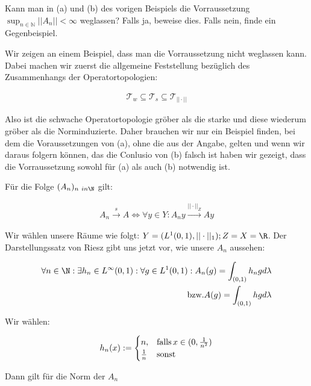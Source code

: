 \begin{exercise}
Kann man in (a) und (b) des vorigen Beispiels die Vorraussetzung
$\sup_{n \in \mathbb{N}} ||A_n|| < \infty$ weglassen?
Falls ja, beweise dies. Falls nein, finde ein Gegenbeispiel.
\end{exercise}
\begin{solution}

Wir zeigen an einem Beispiel, dass man die Vorraussetzung nicht weglassen kann.
Dabei machen wir zuerst die allgemeine Feststellung bezüglich des Zusammenhangs der
Operatortopologien:

\begin{align*}
  \mathcal{T}_w \subseteq \mathcal{T}_s \subseteq \mathcal{T}_{||\cdot||}
\end{align*}

Also ist die schwache Operatortopologie gröber als die starke und diese wiederum
gröber als die Norminduzierte. Daher brauchen wir nur ein Beispiel finden, bei dem
die Voraussetzungen von (a), ohne die aus der Angabe, gelten und wenn wir daraus folgern können, das die Conlusio von (b) falsch ist haben wir gezeigt, dass die Vorraussetzung sowohl
für (a) als auch (b) notwendig ist.

Für die Folge $(A_n)_{n \ in \N}$ gilt:

\begin{align*}
  A_n \stackrel{s}{\rightarrow} A
  \Leftrightarrow
  \forall y \in Y: A_n y \stackrel{||\cdot||_Z}{\rightarrow} Ay
\end{align*}

Wir wählen unsere Räume wie folgt: $Y = (L^1 (0,1), ||\cdot||_1) ; Z=X=\R$. Der
Darstellungssatz von Riesz gibt uns jetzt vor, wie unsere $A_n$ aussehen:

\begin{align*}
  \forall n \in \N: \exists h_n \in L^{\infty}(0,1):
  \forall g \in L^1 (0,1): A_n(g) = \int_{(0,1)}h_n g d\lambda \\
  \text{bzw.} A(g)= \int_{(0,1)} hg d\lambda
\end{align*}

Wir wählen:

\begin{align*}
  h_n (x):= \begin{cases}
    n, & \text{falls\,} x \in (0,\frac{1}{n^2}) \\
    \frac{1}{n} & \text{sonst}
  \end{cases}
\end{align*}

Dann gilt für die Norm der $A_n$

\end{solution}
